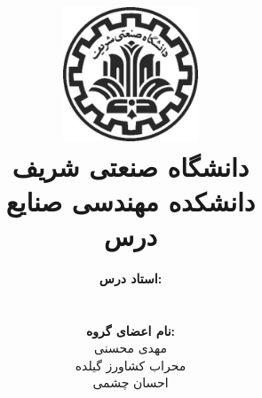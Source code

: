 \title{
	\center
	\includegraphics[width=4cm, height=4cm]{images/shariflogo.jpg} 
	\small 
	\\ دانشگاه صنعتی شریف\\دانشکده مهندسی صنایع \\ درس 
	\normalsize
	\\[60pt]
	\textbf{\huge\CourseName}
}
\author{
	\textbf{استاد درس:}
	\\
	\Instructor
 	\\
	\\
	\textbf{نام اعضای گروه:}
	\\مهدی محسنی 
	\\محراب کشاورز گیلده 
	\\احسان چشمی
	\\[45pt]
}
\date{{\small\Semester}}